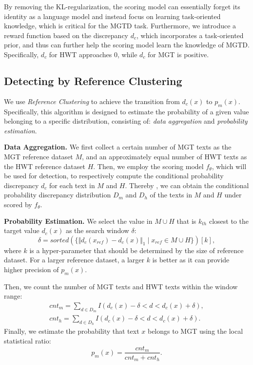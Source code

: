 By removing the KL-regularization, the scoring model can essentially forget its identity as a language model and instead focus on learning task-oriented knowledge, which is critical for the MGTD task.
%
Furthermore, we introduce a reward function based on the discrepancy $d_c$, which incorporates a task-oriented prior, and thus can further help the scoring model learn the knowledge of MGTD.
%
Specifically, $d_c$ for HWT approaches $0$, while $d_c$ for MGT is positive.


\subsection{Detecting by Reference Clustering}\label{3.3}
We use \textit{Reference Clustering} to achieve the transition from $d_c(x)$ to $p_{m}(x)$.
%
Specifically, this algorithm is designed to estimate the probability of a given value belonging to a specific distribution, consisting of: \textit{data aggregation} and \textit{probability estimation}.

\noindent \textbf{Data Aggregation. }
We first collect a certain number of MGT texts as the MGT reference dataset $M$, and an approximately equal number of HWT texts as the HWT reference dataset $H$.
%
Then, we employ the scoring model $f_\theta$, which will be used for detection, to respectively compute the conditional probability discrepancy $d_c$ for each text in $M$ and $H$.
%
Thereby , we can obtain the conditional probability discrepancy distribution $D_m$ and $D_h$ of the texts in $M$ and $H$ under scored by $f_\theta$.


\noindent \textbf{Probability Estimation. }
We select the value in $M\cup H$ that is $k_{th}$ closest to the target value $d_c(x)$ as the search window $\delta$:
\begin{equation}
    \delta = sorted(\{\Vert d_c(x_{ref}) - d_c(x)\Vert_1 \mid x_{ref}\in M \cup H\})[k],
    \label{3.3.4}
\end{equation}
where $k$ is a hyper-parameter that should be determined by the size of reference dataset.
%
For a larger reference dataset, a larger $k$ is better as it can provide higher precision of $p_{m}(x)$.

Then, we count the number of MGT texts and HWT texts within the window range:
\begin{equation}
    \begin{aligned}
        cnt_m = \sum_{d\in D_m}I(d_c(x) - \delta < d < d_c(x) + \delta),\\
        cnt_h = \sum_{d\in D_h}I(d_c(x) - \delta < d < d_c(x) + \delta).
    \end{aligned}
    \label{3.3.5}
\end{equation}
Finally, we estimate the probability that text $x$ belongs to MGT using the local statistical ratio:
\begin{equation}
    p_m(x) = \frac{cnt_m}{cnt_m + cnt_h}.
    \label{3.3.6}
\end{equation}

